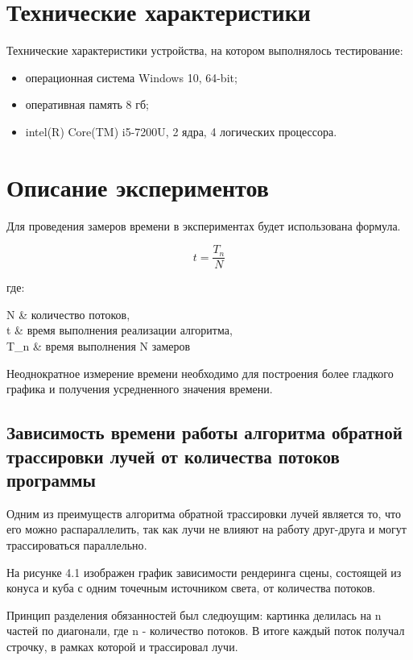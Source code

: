\documentclass[12pt,a4paper,oneside]{report}
\makeatletter
\newenvironment{conditions*}
{\par\vspace{\abovedisplayskip}\noindent
	\tabularx{\columnwidth}{>{$}l<{$} @{${}-{}$} >{\raggedright\arraybackslash}X}}
{\endtabularx\par\vspace{\belowdisplayskip}}
\makeatother
\begin{document}
	
	\section{Технические характеристики}
	 \quad Технические характеристики устройства, на котором выполнялось тестирование:
	\begin{itemize}
		\item операционная система Windows 10, 64-bit;
		\item оперативная память 8 гб;
		\item intel(R) Core(TM) i5-7200U, 2 ядра, 4 логических процессора.
	\end{itemize}

	\section{Описание экспериментов}
	 \quad Для проведения замеров времени в экспериментах будет использована формула.
	
	\begin{equation}
	t = \frac{T_n}{N}
	\end{equation}
	
	где:
	\begin{conditions*}
		N & количество потоков,\\
		t & время выполнения реализации алгоритма,\\
		T_n & время выполнения N замеров
	\end{conditions*}

	 Неоднократное измерение времени необходимо для построения более гладкого графика и получения усредненного значения времени.
	
	\subsection{Зависимость времени работы алгоритма обратной трассировки лучей от количества потоков программы}
	
	 \quad Одним из преимуществ алгоритма обратной трассировки лучей является то, что его можно распараллелить, так как лучи не влияют на работу друг-друга и могут трассироваться параллельно\cite{t}.
	
	 На рисунке 4.1 изображен график зависимости рендеринга сцены, состоящей из конуса и куба с одним точечным источником света, от количества потоков.
	
	 Принцип разделения обязанностей был следюущим: картинка делилась на n частей по диагонали, где n - количество потоков. В итоге каждый поток получал строчку, в рамках которой и трассировал лучи.
	
\end{document}
